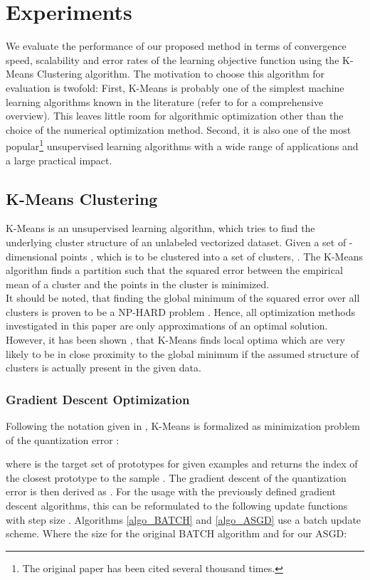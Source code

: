 \documentclass{acm_proc_article-sp}
\begin{document}
\section{Experiments} \label{sec_eval}
We evaluate the performance of our proposed method in terms of convergence speed, 
scalability and error rates of the learning objective function using the 
K-Means Clustering algorithm. The motivation to choose this algorithm for
evaluation is twofold: First, K-Means is probably one of the simplest machine
learning algorithms known in the literature (refer to \cite{jain2010data} for a 
comprehensive overview). This leaves little room for algorithmic optimization 
other than the choice of the numerical optimization method. Second, it is also
one of the most popular\footnote{The original paper \cite{lloyd1982least} has been
cited several thousand times.} unsupervised learning algorithms with a wide 
range of applications and a large practical impact.        

\subsection{K-Means Clustering}
K-Means is an unsupervised learning algorithm, which tries to find the
underlying cluster structure of an unlabeled vectorized dataset.
Given a set of  -dimensional points , which is to
be clustered into a set of  clusters, . The K-Means
algorithm finds a partition such that the squared error between the
empirical mean of a cluster and the points in the cluster is minimized.\\
It should be noted, that finding the global minimum of the squared error
over all  clusters  is proven to be 
a NP-HARD problem \cite{jain2010data}. Hence, all optimization methods 
investigated in this paper are only approximations of an optimal solution.   
However, it has been shown \cite{Meila}, that K-Means finds local optima 
which are very likely to be in close proximity to the global minimum if the 
assumed structure of  clusters is actually present in the given data.  

\subsubsection*{Gradient Descent Optimization}
Following the notation given in \cite{bottou1994convergence}, K-Means is 
formalized as minimization problem of the quantization error : 
 
where  is the target set of  prototypes for given  examples 
 and  returns the index of the closest prototype to the sample 
.
The gradient descent of the quantization error  is then derived as 
. For the usage with the 
previously defined gradient descent algorithms, 
this can be reformulated to the following update
functions with step size . 
Algorithms \ref{algo_BATCH} and \ref{algo_ASGD} use a batch update scheme.
Where the size  for the original BATCH algorithm and  for 
our ASGD:
\end{document}
